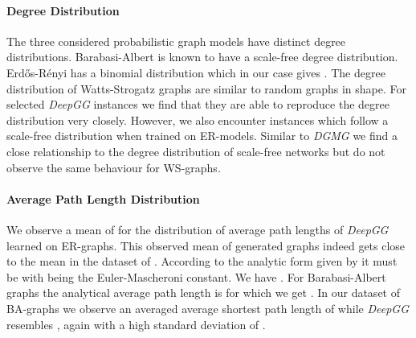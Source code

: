 \documentclass{article}
\begin{document}
\paragraph{Degree Distribution} The three considered probabilistic graph models have distinct degree distributions.
Barabasi-Albert is known to have a scale-free degree distribution.
Erdős-Rényi has a binomial distribution  which in our case gives .
The degree distribution of Watts-Strogatz graphs are similar to random graphs in shape.
For selected \textit{DeepGG} instances we find that they are able to reproduce the degree distribution very closely.
However, we also encounter instances which follow a scale-free distribution when trained on ER-models.
Similar to \textit{DGMG} we find a close relationship to the degree distribution of scale-free networks but do not observe the same behaviour for WS-graphs.




\paragraph{Average Path Length Distribution}
We observe a mean of  for the distribution of average path lengths of \textit{DeepGG} learned on ER-graphs.
This observed mean of generated graphs indeed gets close to the mean in the dataset of .
According to the analytic form given by \cite{fronczak2004average} it must be  with  being the Euler-Mascheroni constant.
We have .
For Barabasi-Albert graphs the analytical average path length is  for which we get .
In our dataset of BA-graphs we observe an averaged average shortest path length of  while \textit{DeepGG} resembles , again with a high standard deviation of .
\end{document}
